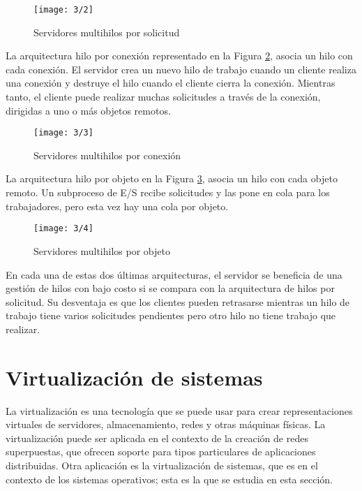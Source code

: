  		 \begin{figure} %
 			\texttt{[image: 3/2]}  		 	 	 
 	\caption{Servidores multihilos por solicitud}
 	\label{fig:hilo-sol-1}
 \end{figure}
 
 
 La arquitectura hilo por conexión representado en la Figura \ref{fig:hilo-sol-2}, asocia un hilo con cada conexión. El servidor crea un nuevo hilo de trabajo cuando un cliente realiza una  conexión y destruye el hilo cuando el cliente cierra la conexión. Mientras tanto, el cliente puede realizar muchas solicitudes a través de la conexión, dirigidas a uno o más objetos remotos. 

 \begin{figure}%
 	\texttt{[image: 3/3]} 	 
	\caption{Servidores multihilos por conexi\'on}
	\label{fig:hilo-sol-2}
\end{figure}
 
  La arquitectura hilo por objeto en la Figura \ref{fig:hilo-sol-3}, asocia un hilo con cada  objeto remoto. Un subproceso de E/S recibe solicitudes y las pone en cola para los trabajadores, pero esta vez hay una cola por objeto.
   
    \begin{figure} %
   	\texttt{[image: 3/4]} 	 
   	\caption{Servidores multihilos por objeto}
   	\label{fig:hilo-sol-3}
   \end{figure}
 
En cada una de estas dos últimas arquitecturas, el servidor se beneficia de una gestión de hilos con bajo costo si se compara con la arquitectura de hilos por solicitud. Su desventaja es que los clientes pueden retrasarse mientras un hilo de trabajo tiene varios solicitudes pendientes pero otro hilo no tiene trabajo que realizar.




	
	\section{Virtualizaci\'on de sistemas}   
	La virtualización es una tecnología que se puede usar para crear representaciones virtuales de servidores, almacenamiento, redes y otras máquinas físicas.
	La virtualización puede ser aplicada en el contexto de la creación de \gls{redes superpuestas}, que ofrecen soporte para tipos particulares de aplicaciones  distribuidas. Otra aplicación es la virtualización de sistemas, que es en el contexto  de los sistemas operativos; esta es la que se estudia en esta sección. 
	
